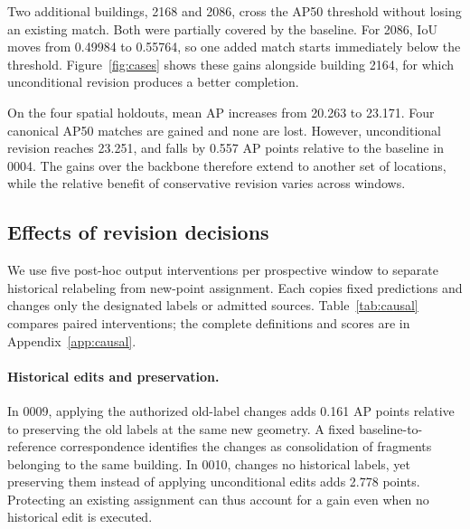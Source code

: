 Two additional buildings, 2168 and 2086, cross the AP50 threshold without losing an existing match. Both were partially covered by the baseline. For 2086, IoU moves from 0.49984 to 0.55764, so one added match starts immediately below the threshold. Figure~\ref{fig:cases} shows these gains alongside building 2164, for which unconditional revision produces a better completion.

On the four spatial holdouts, mean AP increases from 20.263 to 23.171. Four canonical AP50 matches are gained and none are lost. However, unconditional revision reaches 23.251, and \ours{} falls by 0.557 AP points relative to the baseline in 0004. The gains over the backbone therefore extend to another set of locations, while the relative benefit of conservative revision varies across windows.



\subsection{Effects of revision decisions}
We use five post-hoc output interventions per prospective window to separate historical relabeling from new-point assignment. Each copies fixed predictions and changes only the designated labels or admitted sources. Table~\ref{tab:causal} compares paired interventions; the complete definitions and scores are in Appendix~\ref{app:causal}.

\begin{table}[t]
\centering\footnotesize

\caption{AP differences between paired output interventions. Historical-label contrasts hold new coordinates, labels, and scores fixed; new-point contrasts hold historical decisions fixed. Rows are conditional effects and are not additive.}
\label{tab:causal}
\end{table}

\paragraph{Historical edits and preservation.}
In 0009, applying the authorized old-label changes adds 0.161 AP points relative to preserving the old labels at the same new geometry. A fixed baseline-to-reference correspondence identifies the changes as consolidation of fragments belonging to the same building. In 0010, \ours{} changes no historical labels, yet preserving them instead of applying unconditional edits adds 2.778 points. Protecting an existing assignment can thus account for a gain even when no historical edit is executed.

